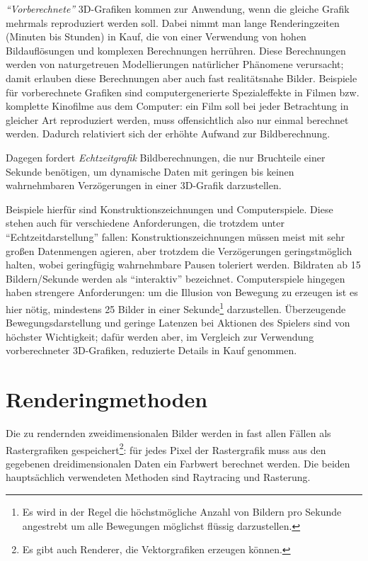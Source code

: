\documentclass[twoside,a4paper,fleqn,12pt]{book}
\begin{document}
\emph{"`Vorberechnete"'} 3D-Grafiken kommen zur Anwendung, wenn die gleiche Grafik mehrmals reproduziert werden
soll. Dabei nimmt man lange Renderingzeiten (Minuten bis Stunden) in Kauf, die von einer Verwendung von hohen
Bildauflösungen und komplexen Berechnungen herrühren. Diese Berechnungen werden von naturgetreuen Modellierungen 
natürlicher Phänomene verursacht; damit erlauben diese Berechnungen aber auch fast realitätsnahe Bilder. Beispiele 
für vorberechnete Grafiken sind computergenerierte Spezialeffekte in Filmen bzw. komplette Kinofilme aus dem Computer: 
ein Film soll bei jeder Betrachtung in gleicher Art reproduziert werden, muss offensichtlich also nur einmal berechnet
werden. Dadurch relativiert sich der erhöhte Aufwand zur Bildberechnung.

Dagegen fordert \emph{Echtzeitgrafik} Bildberechnungen, die nur Bruchteile einer Sekunde benötigen, um
dynamische Daten mit geringen bis keinen wahrnehmbaren Verzögerungen in einer 3D-Grafik 
darzustellen.

Beispiele hierfür sind Konstruktionszeichnungen und Computerspiele. Diese stehen auch für verschiedene Anforderungen,
die trotzdem unter "`Echtzeitdarstellung"' fallen: Konstruktionszeichnungen müssen meist mit sehr großen Datenmengen 
agieren, aber trotzdem die Verzögerungen geringstmöglich halten, wobei geringfügig wahrnehmbare Pausen toleriert
werden. Bildraten ab 15 Bildern/Sekunde werden als "`interaktiv"' bezeichnet. %
Computerspiele hingegen haben strengere Anforderungen: um die Illusion von Bewegung zu erzeugen ist es hier nötig,
 mindestens 25 Bilder in einer Sekunde\footnote{Es wird in der Regel die höchstmögliche Anzahl von Bildern pro Sekunde 
angestrebt um alle Bewegungen möglichst flüssig darzustellen.} darzustellen. Überzeugende Bewegungsdarstellung und
geringe Latenzen bei Aktionen des Spielers sind von höchster Wichtigkeit; dafür werden aber, im Vergleich zur
Verwendung vorberechneter 3D-Grafiken, reduzierte Details in Kauf genommen.

\section{Renderingmethoden}

Die zu rendernden zweidimensionalen Bilder werden in fast allen Fällen als Rastergrafiken gespeichert\footnote{Es gibt
auch Renderer, die Vektorgrafiken erzeugen können.}: für jedes Pixel der Rastergrafik muss aus den gegebenen dreidimensionalen
Daten ein Farbwert berechnet werden. Die beiden hauptsächlich verwendeten Methoden sind Raytracing und Rasterung.
\end{document}
